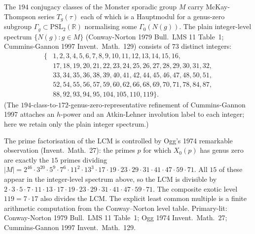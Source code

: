 \begin{remark}
\label{rem:latfnd-w18-witten-CN-spectrum}
The $194$ conjugacy classes of the Monster sporadic group $M$ carry
McKay-Thompson series $T_g(\tau)$ each of which is a Hauptmodul for
a genus-zero subgroup $\Gamma_g\subset\mathrm{PSL}_2(\mathbb{R})$
normalising some $\Gamma_0(N(g))$. The plain integer-level spectrum
$\{N(g): g \in M\}$ (Conway-Norton 1979 Bull.\ LMS 11 Table~1;
Cummins-Gannon 1997 Invent.\ Math.~129) consists of $73$ distinct
integers:
\[
\begin{aligned}
 \{&1, 2, 3, 4, 5, 6, 7, 8, 9, 10, 11, 12, 13, 14, 15, 16,\\
 &17, 18, 19, 20, 21, 22, 23, 24, 25, 26, 27, 28, 29, 30, 31, 32,\\
 &33, 34, 35, 36, 38, 39, 40, 41, 42, 44, 45, 46, 47, 48, 50, 51,\\
 &52, 54, 55, 56, 57, 59, 60, 62, 66, 68, 69, 70, 71, 78, 84, 87,\\
 &88, 92, 93, 94, 95, 104, 105, 110, 119\}.
\end{aligned}
\]
(The $194$-class-to-$172$-genus-zero-representative refinement of
Cummins-Gannon 1997 attaches an $h$-power and an Atkin-Lehner
involution label to each integer; here we retain only the plain
integer spectrum.)

The prime factorisation of the LCM is controlled by Ogg's 1974
remarkable observation (Invent.\ Math.~27): the primes $p$ for
which $X_0(p)$ has genus zero are exactly the $15$ primes dividing
$|M| = 2^{46}\cdot 3^{20}\cdot 5^9\cdot 7^6\cdot 11^2\cdot 13^3\cdot
17\cdot 19\cdot 23\cdot 29\cdot 31\cdot 41\cdot 47\cdot 59\cdot 71$.
All $15$ of these appear in the integer-level spectrum above, so
the LCM is divisible by $2\cdot 3\cdot 5\cdot 7\cdot 11\cdot 13\cdot
17\cdot 19\cdot 23\cdot 29\cdot 31\cdot 41\cdot 47\cdot 59\cdot 71$.
The composite exotic level $119 = 7\cdot 17$ also divides the LCM.
The explicit least common multiple is a finite arithmetic computation
from the Conway--Norton level table.
Primary-lit: Conway-Norton 1979 Bull.\ LMS 11 Table~1; Ogg 1974
Invent.\ Math.~27; Cummins-Gannon 1997 Invent.\ Math.~129.
\end{remark}

